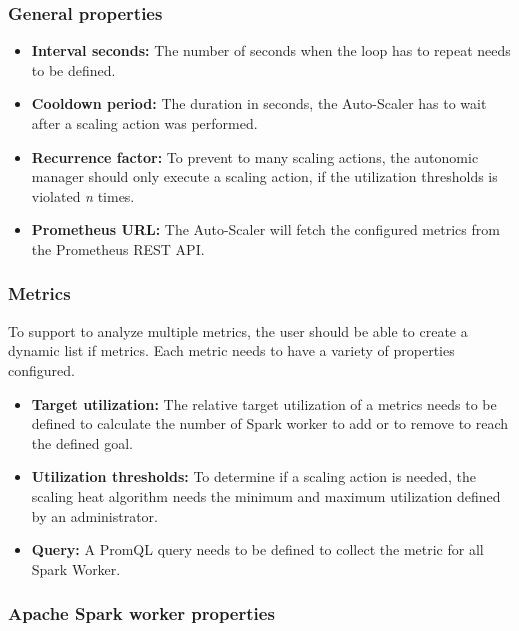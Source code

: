\subsubsection{General properties}

\begin{itemize}
\item \textbf{Interval seconds:} The number of seconds when the loop has to repeat needs to be defined.

\item \textbf{Cooldown period:} The duration in seconds,  the Auto-Scaler has to wait after a scaling action was performed.

\item \textbf{Recurrence factor:} To prevent to many scaling actions,  the autonomic manager should only execute a scaling action,  if the utilization thresholds is violated \textit{n} times.

\item \textbf{Prometheus URL:} The Auto-Scaler will fetch the configured metrics from the Prometheus REST API.
\end{itemize}

\subsubsection{Metrics}

To support to analyze multiple metrics, the user should be able to create a dynamic list if metrics. Each metric needs to have a variety of properties configured.

\begin{itemize}
\item \textbf{Target utilization:} The relative target utilization of a metrics needs to be defined to calculate the number of Spark worker to add or to remove to reach the defined goal.

\item \textbf{Utilization thresholds:} To determine if a scaling action is needed, the scaling heat algorithm needs the minimum and maximum utilization defined by an administrator.

\item \textbf{Query:} A PromQL query needs to be defined to collect the metric for all Spark Worker.
\end{itemize}

\subsubsection{Apache Spark worker properties}

